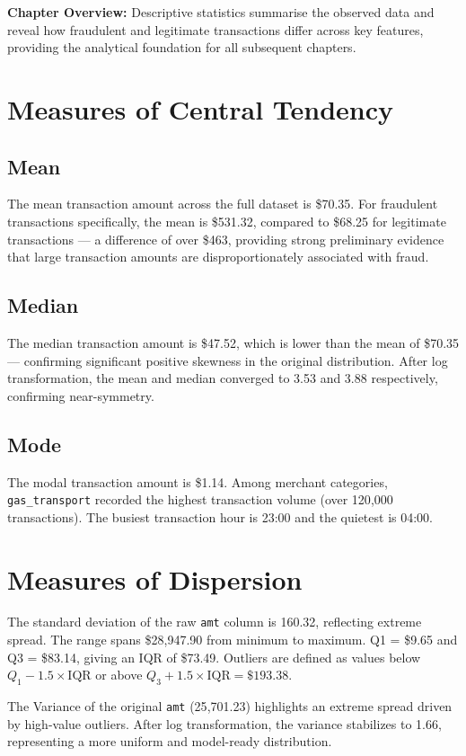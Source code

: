 \documentclass[12pt,a4paper]{report}
\begin{document}
\textbf{Chapter Overview:} Descriptive statistics summarise the observed data and reveal how fraudulent and legitimate transactions differ across key features, providing the analytical foundation for all subsequent chapters.

\section{Measures of Central Tendency}

\subsection{Mean}
The mean transaction amount across the full dataset is \$70.35. For fraudulent transactions specifically, the mean is \$531.32, compared to \$68.25 for legitimate transactions --- a difference of over \$463, providing strong preliminary evidence that large transaction amounts are disproportionately associated with fraud.

\subsection{Median}
The median transaction amount is \$47.52, which is lower than the mean of \$70.35 --- confirming significant positive skewness in the original distribution. After log transformation, the mean and median converged to 3.53 and 3.88 respectively, confirming near-symmetry.

\subsection{Mode}
The modal transaction amount is \$1.14. Among merchant categories, \texttt{gas\_transport} recorded the highest transaction volume (over 120{,}000 transactions). The busiest transaction hour is 23:00 and the quietest is 04:00.

\section{Measures of Dispersion}

The standard deviation of the raw \texttt{amt} column is 160.32, reflecting extreme spread. The range spans \$28{,}947.90 from minimum to maximum. Q1 = \$9.65 and Q3 = \$83.14, giving an IQR of \$73.49. Outliers are defined as values below $Q_1 - 1.5 \times \text{IQR}$ or above $Q_3 + 1.5 \times \text{IQR} = \$193.38$.

The Variance of the original \texttt{amt} (25{,}701.23) highlights an extreme spread driven by high-value outliers. After log transformation, the variance stabilizes to 1.66, representing a more uniform and model-ready distribution.
\end{document}
